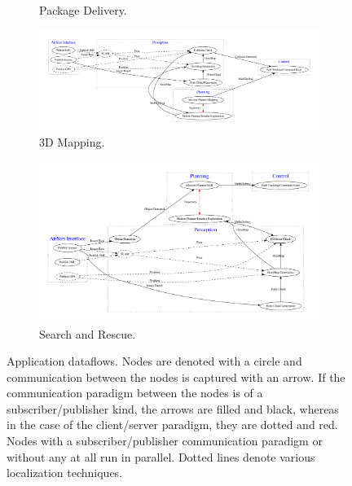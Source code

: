 \begin{figure}[t!]
\begin{subfigure}[t]{\columnwidth}
        \vspace{-20pt}
		\caption{Package Delivery.}\label{fig:benchmarks:data-flow:package_deilvery}
	\end{subfigure}
    \begin{subfigure}[t]{\columnwidth}
		\centering
		\includegraphics[width=\columnwidth]{figs/data_flow/mapping}
        \vspace{-20pt}
		\caption{3D Mapping.}\label{fig:benchmarks:data-flow:mapping}
	\end{subfigure}
    \begin{subfigure}[t]{\columnwidth}
		\centering
		\includegraphics[width=\columnwidth]{figs/data_flow/sar}
		\caption{Search and Rescue.}\label{fig:benchmarks:data-flow:sar}
	\end{subfigure}
    \caption{Application dataflows. Nodes are denoted with a circle and communication between the nodes is captured with an arrow. If the communication paradigm between the nodes is of a subscriber/publisher kind, the arrows are filled and black, whereas in the case of the client/server paradigm, they are dotted and red. Nodes with a subscriber/publisher communication paradigm or without any at all run in parallel. Dotted lines denote various localization techniques.}
    \label{fig:benchmarks_data_flow}
\end{figure}

